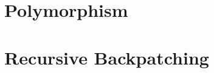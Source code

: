\chapter{Polymorphism}
\label{ch:polymorphism}


%

%

\chapter{Recursive Backpatching}
\label{ch:recursive-backpatching}


%

%
